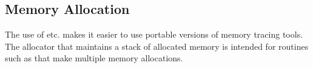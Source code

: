 \documentclass{article}
\begin{document}




\subsection{Memory Allocation}
The use of  etc. makes it easier to use portable versions of
memory tracing tools.  The allocator that maintains a stack of allocated
memory is intended for routines such as  that make
multiple memory allocations.
\end{document}

